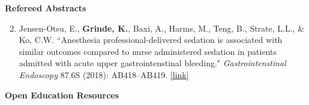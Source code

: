 \documentclass[margin]{res}
\newenvironment{benumerate}[1]{
    \let\oldItem\item
    \def\item{\addtocounter{enumi}{-2}\oldItem}
    
    \begin{enumerate}
    \setcounter{enumi}{#1}
    \addtocounter{enumi}{1}
}{
    \end{enumerate}
}
\begin{document}
\begin{resume}
\textbf{Refereed Abstracts}
\begin{benumerate}{1}
\item Jensen-Otsu, E., \textbf{Grinde, K.}, Baxi, A., Harms, M., Teng, B., Strate, L.L., \& Ko, C.W. 
``Anesthesia professional-delivered sedation is associated with similar outcomes compared to nurse administered sedation in patients admitted with acute upper gastrointenstinal bleeding." \textit{Gastrointenstinal Endoscopy} 87.6S (2018):  AB418--AB419. %
\href{https://www.giejournal.org/article/S0016-5107(18)32182-5/fulltext}{[link]}

\end{benumerate}



\textbf{Open Education Resources}

\begin{itemize}



\end{itemize}
\end{resume}
\end{document}
